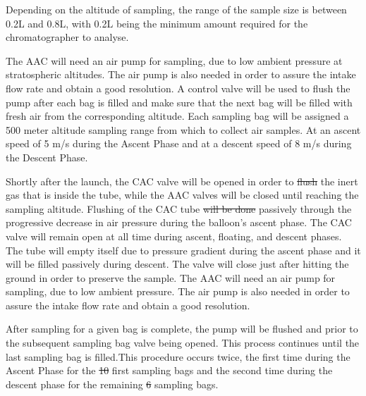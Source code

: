 \documentclass[a4paper,12pt,twoside]{article}
\providecommand{\DIFaddtex}[1]{{\protect\color{blue}\uwave{#1}}} %
\providecommand{\DIFdeltex}[1]{{\protect\color{red}\sout{#1}}}                      %
\providecommand{\DIFaddbegin}{} %
\providecommand{\DIFaddend}{} %
\providecommand{\DIFdelbegin}{} %
\providecommand{\DIFdelend}{} %
\providecommand{\DIFadd}[1]{\texorpdfstring{\DIFaddtex{#1}}{#1}} %
\providecommand{\DIFdel}[1]{\texorpdfstring{\DIFdeltex{#1}}{}} %
\newcommand{\DIFscaledelfig}{0.5}
\newlength{\DIFdelgraphicswidth} %
\newlength{\DIFdelgraphicsheight} %
\newcommand{\DIFaddincludegraphics}[2][]{{\color{blue}\fbox{\DIFOincludegraphics[#1]{#2}}}} %
\newcommand{\DIFdelincludegraphics}[2][]{%
\sbox{\DIFdelgraphicsbox}{\DIFOincludegraphics[#1]{#2}}%
\settoboxwidth{\DIFdelgraphicswidth}{\DIFdelgraphicsbox} %
\settoboxtotalheight{\DIFdelgraphicsheight}{\DIFdelgraphicsbox} %
\scalebox{\DIFscaledelfig}{%
\parbox[b]{\DIFdelgraphicswidth}{\usebox{\DIFdelgraphicsbox}\\[-\baselineskip] \rule{\DIFdelgraphicswidth}{0em}}\llap{\resizebox{\DIFdelgraphicswidth}{\DIFdelgraphicsheight}{%
\setlength{\unitlength}{\DIFdelgraphicswidth}%
\begin{picture}(1,1)%
\thicklines\linethickness{2pt} %
{\color[rgb]{1,0,0}\put(0,0){\framebox(1,1){}}}%
{\color[rgb]{1,0,0}\put(0,0){\line( 1,1){1}}}%
{\color[rgb]{1,0,0}\put(0,1){\line(1,-1){1}}}%
\end{picture}%
}\hspace*{3pt}}} %
} %
\DeclareRobustCommand{\DIFaddbegin}{\DIFOaddbegin \let\includegraphics\DIFaddincludegraphics} %
\DeclareRobustCommand{\DIFaddend}{\DIFOaddend \let\includegraphics\DIFOincludegraphics} %
\DeclareRobustCommand{\DIFdelbegin}{\DIFOdelbegin \let\includegraphics\DIFdelincludegraphics} %
\DeclareRobustCommand{\DIFdelend}{\DIFOaddend \let\includegraphics\DIFOincludegraphics} %
\begin{document}
Depending on the altitude of sampling, the range of the sample size is between 0.2L and 0.8L, with 0.2L being the minimum amount required for the chromatographer to analyse. 

The AAC will need an air pump for sampling, due to low ambient pressure at stratospheric altitudes. The air pump is also needed in order to assure the intake flow rate and obtain a good resolution. A control valve will be used to flush the pump after each bag is filled and make sure that the next bag will be filled with fresh air from the corresponding altitude. Each sampling bag will be assigned a 500 meter altitude sampling range from which to collect air samples. At an ascent speed of 5 m/s during the Ascent Phase and at a descent speed of 8 m/s during the Descent Phase. 

Shortly after the launch, the CAC valve will be opened in order to \DIFdelbegin \DIFdel{flush }\DIFdelend \DIFaddbegin \DIFadd{allow flushing }\DIFaddend the inert gas that is inside the tube, while the AAC valves will be closed until reaching the sampling altitude. Flushing of the CAC tube \DIFdelbegin \DIFdel{will be done }\DIFdelend \DIFaddbegin \DIFadd{happens }\DIFaddend passively through the progressive decrease in air pressure during the balloon's ascent phase. The CAC valve will remain open at all time during ascent, floating, and descent phases. The tube will empty itself due to pressure gradient during the ascent phase and it will be filled passively during descent. The valve will close just after hitting the ground in order to preserve the sample. The AAC will need an air pump for sampling, due to low ambient pressure. The air pump is also needed in order to assure the intake flow rate and obtain a good resolution.

After sampling for a given bag is complete, the pump will be flushed and prior to the subsequent sampling bag valve being opened. This process continues until the last sampling bag is filled.This procedure occurs twice, the first time during the Ascent Phase for the \DIFdelbegin \DIFdel{10 }\DIFdelend \DIFaddbegin \DIFadd{6 }\DIFaddend first sampling bags and the second time during the descent phase for the remaining \DIFdelbegin \DIFdel{6 }\DIFdelend \DIFaddbegin \DIFadd{4 }\DIFaddend sampling bags.
\end{document}
